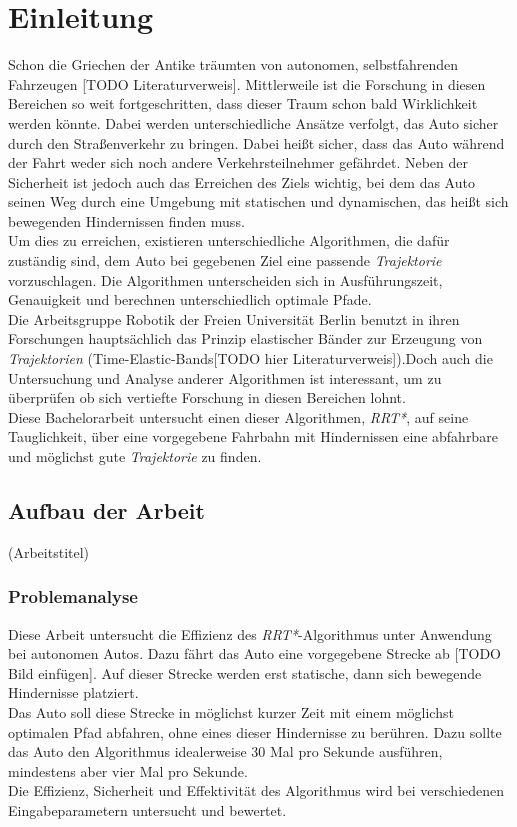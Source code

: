 \section{Einleitung}
Schon die Griechen der Antike träumten von autonomen, selbstfahrenden Fahrzeugen [TODO Literaturverweis]. Mittlerweile ist die Forschung in diesen Bereichen so weit fortgeschritten, dass dieser Traum schon bald Wirklichkeit werden könnte. Dabei werden unterschiedliche Ansätze verfolgt, das Auto sicher durch den Straßenverkehr zu bringen. Dabei heißt sicher, dass das Auto während der Fahrt weder sich noch andere Verkehrsteilnehmer gefährdet. Neben der Sicherheit ist jedoch auch das Erreichen des Ziels wichtig, bei dem das Auto seinen Weg durch eine Umgebung mit statischen und dynamischen, das heißt sich bewegenden Hindernissen finden muss. \\
Um dies zu erreichen, existieren unterschiedliche Algorithmen, die dafür zuständig sind, dem Auto bei gegebenen Ziel eine passende \textit{Trajektorie} vorzuschlagen. Die Algorithmen unterscheiden sich in Ausführungszeit, Genauigkeit und berechnen unterschiedlich optimale Pfade.  \\
Die Arbeitsgruppe Robotik der Freien Universität Berlin benutzt in ihren Forschungen hauptsächlich das Prinzip elastischer Bänder zur Erzeugung von \textit{Trajektorien} (Time-Elastic-Bands[TODO hier Literaturverweis]).Doch auch die Untersuchung und Analyse anderer Algorithmen ist interessant, um zu überprüfen ob sich vertiefte Forschung in diesen Bereichen lohnt. \\
Diese Bachelorarbeit untersucht einen dieser Algorithmen, \textit{RRT*}, auf seine Tauglichkeit, über eine vorgegebene Fahrbahn mit Hindernissen eine abfahrbare und möglichst gute \textit{Trajektorie} zu finden.



\subsection{Aufbau der Arbeit}
(Arbeitstitel) \\
\subsubsection{Problemanalyse}
Diese Arbeit untersucht die Effizienz des\textit{ RRT*}-Algorithmus unter Anwendung bei autonomen Autos. Dazu fährt das Auto eine vorgegebene Strecke ab [TODO Bild einfügen]. Auf dieser Strecke werden erst statische, dann sich bewegende Hindernisse platziert. \\
Das Auto soll diese Strecke in möglichst kurzer Zeit mit einem möglichst optimalen Pfad abfahren, ohne eines dieser Hindernisse zu berühren. Dazu sollte das Auto den Algorithmus idealerweise 30 Mal pro Sekunde ausführen, mindestens aber vier Mal pro Sekunde. \\
Die Effizienz, Sicherheit und Effektivität des Algorithmus wird bei verschiedenen Eingabeparametern untersucht und bewertet. \\


